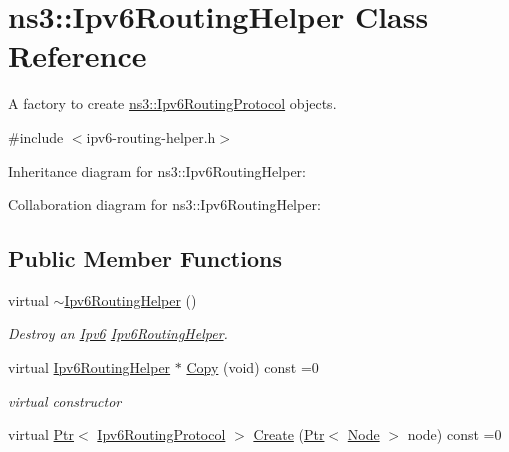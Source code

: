 \hypertarget{classns3_1_1Ipv6RoutingHelper}{}\section{ns3\+:\+:Ipv6\+Routing\+Helper Class Reference}
\label{classns3_1_1Ipv6RoutingHelper}


A factory to create \hyperlink{classns3_1_1Ipv6RoutingProtocol}{ns3\+::\+Ipv6\+Routing\+Protocol} objects.  




{\ttfamily \#include $<$ipv6-\/routing-\/helper.\+h$>$}



Inheritance diagram for ns3\+:\+:Ipv6\+Routing\+Helper\+:


Collaboration diagram for ns3\+:\+:Ipv6\+Routing\+Helper\+:
\subsection*{Public Member Functions}
\begin{DoxyCompactItemize}
\item 
virtual \hyperlink{classns3_1_1Ipv6RoutingHelper_aabadb66ac986e5978239526292d5a346}{$\sim$\+Ipv6\+Routing\+Helper} ()
\begin{DoxyCompactList}\small\item\em Destroy an \hyperlink{classns3_1_1Ipv6}{Ipv6} \hyperlink{classns3_1_1Ipv6RoutingHelper}{Ipv6\+Routing\+Helper}. \end{DoxyCompactList}\item 
virtual \hyperlink{classns3_1_1Ipv6RoutingHelper}{Ipv6\+Routing\+Helper} $\ast$ \hyperlink{classns3_1_1Ipv6RoutingHelper_a324f924df9565843a0964e844e35927c}{Copy} (void) const =0
\begin{DoxyCompactList}\small\item\em virtual constructor \end{DoxyCompactList}\item 
virtual \hyperlink{classns3_1_1Ptr}{Ptr}$<$ \hyperlink{classns3_1_1Ipv6RoutingProtocol}{Ipv6\+Routing\+Protocol} $>$ \hyperlink{classns3_1_1Ipv6RoutingHelper_aee8501a0e661843ccf9da08e3e56614b}{Create} (\hyperlink{classns3_1_1Ptr}{Ptr}$<$ \hyperlink{classns3_1_1Node}{Node} $>$ node) const =0
\end{DoxyCompactItemize}
